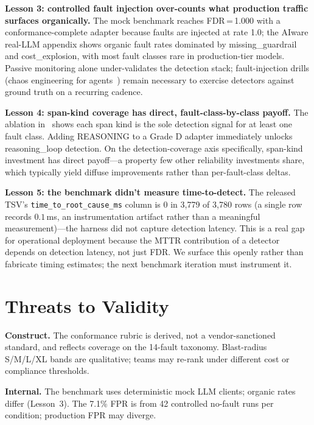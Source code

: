\documentclass[conference]{IEEEtran}
\begin{document}
\textbf{Lesson 3: controlled fault injection over-counts what
production traffic surfaces organically.} The mock benchmark reaches
FDR\,=\,1.000 with a conformance-complete adapter because faults are
injected at rate 1.0; the AIware real-LLM appendix shows organic
fault rates dominated by missing\_guardrail and cost\_explosion,
with most fault classes rare in production-tier models. Passive
monitoring alone under-validates the detection stack;
fault-injection drills (chaos engineering for
agents~\cite{netflix_chaos}) remain necessary to exercise detectors
against ground truth on a recurring cadence.

\textbf{Lesson 4: span-kind coverage has direct, fault-class-by-class
payoff.} The ablation in~\cite{agenttelemetry_aiware} shows each
span kind is the sole detection signal for at least one fault class.
Adding REASONING to a Grade D adapter immediately unlocks
reasoning\_loop detection. On the detection-coverage axis
specifically, span-kind investment has direct payoff---a property
few other reliability investments share, which typically yield
diffuse improvements rather than per-fault-class deltas.

\textbf{Lesson 5: the benchmark didn't measure time-to-detect.}
The released TSV's \texttt{time\_to\_root\_cause\_ms} column is
$0$ in 3{,}779 of 3{,}780 rows (a single row records $0.1$\,ms, an
instrumentation artifact rather than a meaningful measurement)---the
harness did not capture detection latency. This is a real
gap for operational deployment because the MTTR contribution of a
detector depends on detection latency, not just FDR. We surface this
openly rather than fabricate timing estimates; the next benchmark
iteration must instrument it.

\section{Threats to Validity}
\label{sec:threats}

\textbf{Construct.} The conformance rubric is derived, not a
vendor-sanctioned standard, and reflects coverage on the
\cite{agenttelemetry_aiware} 14-fault taxonomy. Blast-radius
S/M/L/XL bands are qualitative; teams may re-rank under different
cost or compliance thresholds.

\textbf{Internal.} The benchmark uses deterministic mock LLM clients;
organic rates differ (Lesson~3). The 7.1\% FPR is from 42 controlled
no-fault runs per condition; production FPR may diverge.
\end{document}
